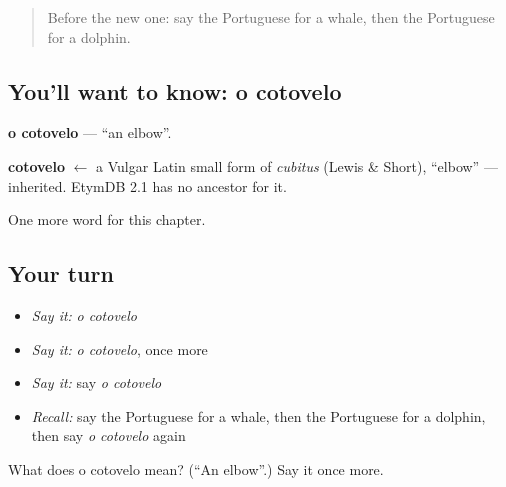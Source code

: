 \begin{quote}
Before the new one: say the Portuguese for a whale, then the Portuguese for a dolphin.
\end{quote}

\subsection*{You'll want to know: o cotovelo}
\textbf{o cotovelo} — \textquotedblleft{}an elbow\textquotedblright{}.

\begin{cousinweb}
\textbf{cotovelo} $\leftarrow$ a Vulgar Latin small form of \emph{cubitus} (Lewis \& Short), \textquotedblleft{}elbow\textquotedblright{} — inherited. EtymDB 2.1 has no ancestor for it.
\end{cousinweb}

\begin{grammarlens}[title={What you've built}]
One more word for this chapter.
\end{grammarlens}

\subsection*{Your turn}
\begin{itemize}
\raggedright
  \item \emph{Say it:} \emph{o cotovelo}
  \item \emph{Say it:} \emph{o cotovelo}, once more
  \item \emph{Say it:} say \emph{o cotovelo}
  \item \emph{Recall:} say the Portuguese for a whale, then the Portuguese for a dolphin, then say \emph{o cotovelo} again
\end{itemize}

\begin{tcolorbox}[breakable,colback=teal!4,colframe=teal!35!black,title={Before you move on}]
What does o cotovelo mean? (\textquotedblleft{}An elbow\textquotedblright{}.) Say it once more.
\end{tcolorbox}
